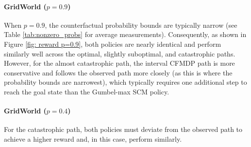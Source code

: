 \paragraph{GridWorld ($p=0.9$)}
When $p=0.9$, the counterfactual probability bounds are typically narrow (see Table \ref{tab:nonzero_probs} for average measurements). Consequently, as shown in Figure \ref{fig: reward p=0.9}, both policies are nearly identical and perform similarly well across the optimal, slightly suboptimal, and catastrophic paths.
%
However, for the almost catastrophic path, the interval CFMDP path is more conservative and follows the observed path more closely (as this is where the probability bounds are narrowest), which typically requires one additional step to reach the goal state than the Gumbel-max SCM policy.
%

\paragraph{GridWorld ($p=0.4$)}
 For the catastrophic path, both policies must deviate from the observed path to achieve a higher reward and, in this case, perform similarly.
%
%
%
%
